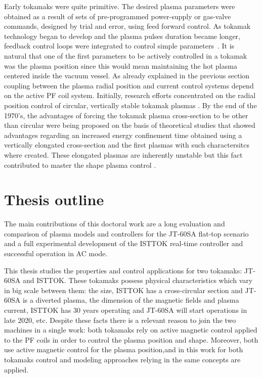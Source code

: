 Early tokamaks were quite primitive. The desired plasma parameters were obtained as a result of sets of pre-programmed power-supply or gas-valve commands, designed by trial and error, using feed forward control. As  tokamak technology began to develop and the plasma pulses duration became longer, feedback control loops were integrated to control simple parameters~\cite{Lister1999}. It is natural that one of the first parameters to be actively controlled in a tokamak was the plasma position since this would mean maintaining the hot plasma centered inside the vacuum vessel. As already explained in the previous section coupling between the plasma radial position and current control systems depend on the active PF coil system. Initially, research efforts concentrated on the radial position control of circular, vertically stable tokamak plasmas \cite[Chapter~1]{PirontiBook}. By the end of the 1970's, the advantages of forcing the tokamak plasma cross-section to be other than circular  were being proposed on the basis of theoretical studies that showed advantages regarding  an increased energy confinement time  obtained using a vertically elongated cross-section and the first plasmas with such charactersitcs where created. These elongated  plasmas are inherently unstable but this fact contributed to master the shape plasma control \cite[Chapter~1]{PirontiBook}. \smallskip



\section{Thesis outline}

The main contributions of this doctoral work  are a long  evaluation and comparison of plasma models and controllers for the  JT-60SA flat-top scenario and  a full experimental  development of the ISTTOK real-time controller and successful operation in AC mode. 

This thesis studies the properties and control applications for two tokamaks: JT-60SA and ISTTOK. These tokamaks possess physical characteristics which vary in big scale between them: the size, ISTTOK has a cross-circular section and JT-60SA is a diverted plasma, the dimension of the magnetic fields and plasma current, ISTTOK has 30 years operating and JT-60SA will start operations in late 2020, etc. Despite these facts there is a relevant reason to join the two machines in a single work: both tokamaks rely on active magnetic control applied to the PF coils in order to control the plasma position and shape. Moreover, both use active magnetic control for the plasma position,and in this work for both tokamaks control and modeling approaches relying in the same concepts are applied.   \smallskip

